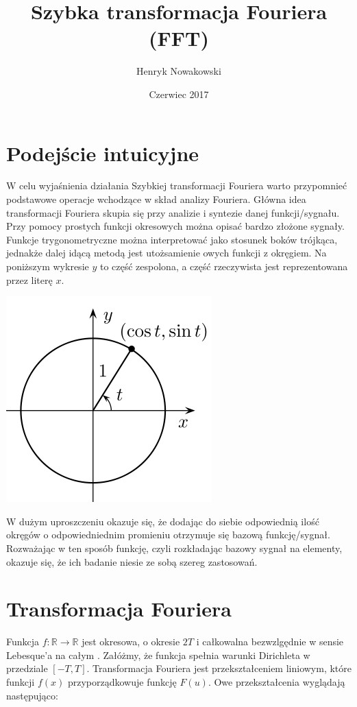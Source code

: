 \documentclass{article}
\title{Szybka transformacja Fouriera (FFT)}
\author{Henryk Nowakowski}
\date{Czerwiec 2017}
\begin{document}
\maketitle

\section{Podejście intuicyjne}
W celu wyjaśnienia działania Szybkiej transformacji Fouriera warto przypomnieć podstawowe operacje wchodzące w skład analizy Fouriera. Główna idea transformacji Fouriera skupia się przy analizie i syntezie danej funkcji/sygnału. Przy pomocy prostych funkcji okresowych można opisać bardzo złożone sygnały. Funkcje trygonometryczne można interpretować jako stosunek boków trójkąca, jednakże dalej idącą metodą jest utożsamienie owych funkcji z okręgiem. Na poniższym wykresie $y$ to część zespolona, a część rzeczywista jest reprezentowana przez literę $x$.

\begin{center}
    \includegraphics[scale=0.3]{complexcircle}
\end{center}

W dużym uproszczeniu okazuje się, że dodając do siebie odpowiednią ilość okręgów o odpowiedniednim promieniu otrzymuje się bazową funkcję/sygnał. Rozważając w ten sposób funkcję, czyli rozkładając bazowy sygnał na elementy, okazuje się, że ich badanie niesie ze sobą szereg zastosowań. 

\newpage

\section{Transformacja Fouriera}
Funkcja $f:  \mathbb{R}\rightarrow\mathbb{R}$ jest okresowa, o okresie $2T$ i całkowalna bezwzlgędnie w sensie Lebesque'a na całym . Załóżmy, że funkcja spełnia warunki Dirichleta w przedziale $[-T,T]$. Transformacja Fouriera jest przekształceniem liniowym, które funkcji $f(x)$ przyporządkowuje funkcję $F(u)$. Owe przekształcenia wyglądają następująco: \\
\end{document}
